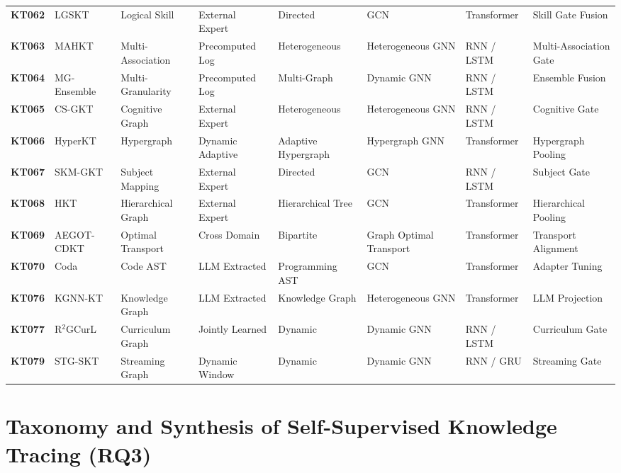 \documentclass[10pt,journal,compsoc]{IEEEtran}
\begin{document}
\begin{table}[t]
{\begin{tabular}{@{}l l l l l l l l@{}}
\textbf{KT062} & LGSKT \cite{KT062_LGSKT_2025} & Logical Skill & External Expert & Directed & GCN & Transformer & Skill Gate Fusion \\
\textbf{KT063} & MAHKT \cite{KT063_MAHKT_2025} & Multi-Association & Precomputed Log & Heterogeneous & Heterogeneous GNN & RNN / LSTM & Multi-Association Gate \\
\textbf{KT064} & MG-Ensemble \cite{KT064_MGEnsemble_2025} & Multi-Granularity & Precomputed Log & Multi-Graph & Dynamic GNN & RNN / LSTM & Ensemble Fusion \\
\textbf{KT065} & CS-GKT \cite{KT065_CSGKT_2025} & Cognitive Graph & External Expert & Heterogeneous & Heterogeneous GNN & RNN / LSTM & Cognitive Gate \\
\textbf{KT066} & HyperKT \cite{KT066_HyperKT_2025} & Hypergraph & Dynamic Adaptive & Adaptive Hypergraph & Hypergraph GNN & Transformer & Hypergraph Pooling \\
\textbf{KT067} & SKM-GKT \cite{KT067_SKMGKT_2025} & Subject Mapping & External Expert & Directed & GCN & RNN / LSTM & Subject Gate \\
\textbf{KT068} & HKT \cite{KT068_HKT_2025} & Hierarchical Graph & External Expert & Hierarchical Tree & GCN & Transformer & Hierarchical Pooling \\
\textbf{KT069} & AEGOT-CDKT \cite{KT069_AEGOTCDKT_2025} & Optimal Transport & Cross Domain & Bipartite & Graph Optimal Transport & Transformer & Transport Alignment \\
\textbf{KT070} & Coda \cite{KT070_Coda_2025} & Code AST & LLM Extracted & Programming AST & GCN & Transformer & Adapter Tuning \\
\textbf{KT076} & KGNN-KT \cite{KT076_KGNNKT_2025} & Knowledge Graph & LLM Extracted & Knowledge Graph & Heterogeneous GNN & Transformer & LLM Projection \\
\textbf{KT077} & R$^2$GCurL \cite{KT077_R2GCurL_2026} & Curriculum Graph & Jointly Learned & Dynamic & Dynamic GNN & RNN / LSTM & Curriculum Gate \\
\textbf{KT079} & STG-SKT \cite{KT079_STGSKT_2026} & Streaming Graph & Dynamic Window & Dynamic & Dynamic GNN & RNN / GRU & Streaming Gate \\
\bottomrule
\end{tabular}
}
\end{table}

\section{Taxonomy and Synthesis of Self-Supervised Knowledge Tracing (RQ3)}
\end{document}
